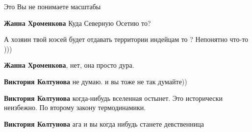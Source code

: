 \begin{itemize}
\begin{itemize}
Это Вы не понимаете масштабы

 
\textbf{Жанна Хроменкова} Куда Северную Осетию то?

 
А хозяин твой юэсей будет отдавать территории индейцам то ? Непонятно что-то )))

 
\textbf{Жанна Хроменкова}, нет, она просто дура.

 
\textbf{Виктория Колтунова}
не думаю. и вы тоже не так думайте))

 
\textbf{Виктория Колтунова} когда-нибудь вселенная остынет. Это исторически неизбежно. По второму закону термодинамики.

 
\textbf{Виктория Колтунова} ага и вы когда нибудь станете девственница

 

\end{itemize}
\end{itemize}
